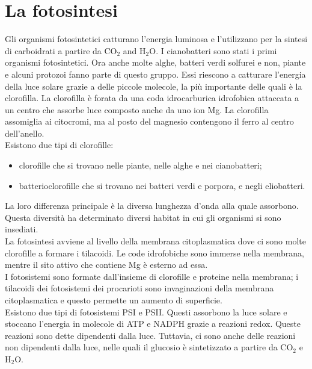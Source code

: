 \section{La fotosintesi}
Gli organismi fotosintetici catturano l'energia luminosa e l'utilizzano per la sintesi di carboidrati a partire da CO$_2$ and H$_2$O. I cianobatteri sono stati i primi organismi fotosintetici. Ora anche molte alghe, batteri verdi solfurei e non, piante e alcuni protozoi fanno parte di questo gruppo. Essi riescono a catturare l'energia della luce solare grazie a delle piccole molecole, la pi\`u importante delle quali \`e la clorofilla. La clorofilla \`e forata da una coda idrocarburica idrofobica attaccata a un centro che assorbe luce composto anche da uno ion Mg. La clorofilla assomiglia ai citocromi, ma al posto del magnesio contengono il ferro al centro dell'anello. 
\\Esistono due tipi di clorofille: 
\begin{itemize}
    \item clorofille che si trovano nelle piante, nelle alghe e nei cianobatteri; 
    \item batterioclorofille che si trovano nei batteri verdi e porpora, e negli eliobatteri.
\end{itemize}
La loro differenza principale \`e la diversa lunghezza d'onda alla quale assorbono. Questa diversit\`a ha determinato diversi habitat in cui gli organismi si sono insediati. 
\\La fotosintesi avviene al livello della membrana citoplasmatica dove ci sono molte clorofille a formare i tilacoidi. Le code idrofobiche sono immerse nella membrana, mentre il sito attivo che contiene Mg \`e esterno ad essa. 
\\I fotosistemi sono formate dall'insieme di clorofille e proteine nella membrana; i tilacoidi dei fotosistemi dei procarioti sono invaginazioni della membrana citoplasmatica e questo permette un aumento di superficie.
\\Esistono due tipi di fotosistemi PSI e PSII. Questi assorbono la luce solare e stoccano l'energia in molecole di ATP e NADPH grazie a reazioni redox. Queste reazioni sono dette dipendenti dalla luce. Tuttavia, ci sono anche delle reazioni non dipendenti dalla luce, nelle quali il glucosio \`e sintetizzato a partire da CO$_2$ e H$_2$O.
